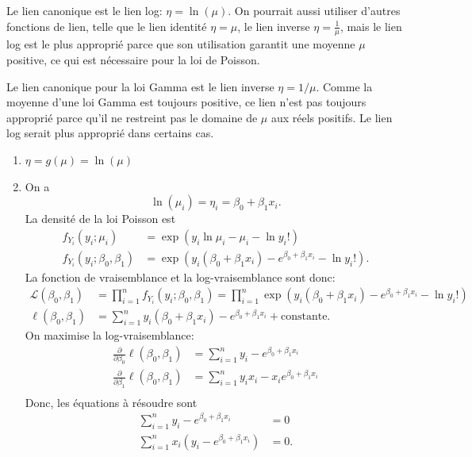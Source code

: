 \begin{solution}{2.2}
Le lien canonique est le lien log: $\eta=\ln(\mu)$. On pourrait aussi utiliser d'autres fonctions de lien, telle que le lien identité $\eta=\mu$, le lien inverse $\eta=\frac{1}{\mu}$, mais le lien log est le plus approprié parce que son utilisation garantit une moyenne $\mu$ positive, ce qui est nécessaire pour la loi de Poisson.
\end{solution}
\begin{solution}{2.3}
Le lien canonique pour la loi Gamma est le lien inverse $\eta=1/\mu$. Comme la moyenne d'une loi Gamma est toujours positive, ce lien n'est pas toujours approprié parce qu'il ne restreint pas le domaine de $\mu$ aux réels positifs. Le lien log serait plus approprié dans certains cas.
\end{solution}
\begin{solution}{2.4}
\begin{enumerate}
\item $\eta=g(\mu)=\ln(\mu)$
\item On a $$\ln(\mu_i)=\eta_i=\beta_0+\beta_1x_i.$$ La densité de la loi Poisson est
\begin{align*}
f_{Y_i}(y_i;\mu_i)&=\exp\left(y_i\ln\mu_i-\mu_i-\ln y_i!\right)\\
f_{Y_i}(y_i;\beta_0,\beta_1)&=\exp\left(y_i(\beta_0+\beta_1x_i)-e^{\beta_0+\beta_1x_i}-\ln y_i!\right).
\end{align*}
La fonction de vraisemblance et la log-vraisemblance sont donc:
\begin{align*}
\mathcal{L}(\beta_0,\beta_1)&=\prod_{i=1}^n f_{Y_i}(y_i;\beta_0,\beta_1)=\prod_{i=1}^n\exp\left(y_i(\beta_0+\beta_1x_i)-e^{\beta_0+\beta_1x_i}-\ln y_i!\right)\\
\ell(\beta_0,\beta_1)&=\sum_{i=1}^n y_i(\beta_0+\beta_1x_i)-e^{\beta_0+\beta_1x_i}+\mbox{constante}.
\end{align*}
On maximise la log-vraisemblance:
\begin{align*}
\frac{\partial}{\partial\beta_0}\ell(\beta_0,\beta_1)&=\sum_{i=1}^n y_i-e^{\beta_0+\beta_1x_i}\\
\frac{\partial}{\partial\beta_1}\ell(\beta_0,\beta_1)&=\sum_{i=1}^n y_ix_i-x_i e^{\beta_0+\beta_1x_i}\\
\end{align*}
Donc, les équations à résoudre sont
\begin{align*}
\sum_{i=1}^n y_i-e^{\beta_0+\beta_1x_i}&=0\\
\sum_{i=1}^n x_i(y_i-e^{\beta_0+\beta_1x_i})&=0.\\
\end{align*}
\end{enumerate}
\end{solution}
